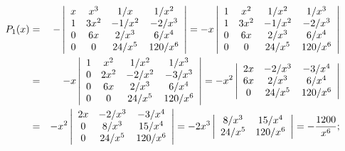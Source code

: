 \documentclass[dvips]{book}
\numberwithin{example}{section}
\numberwithin{equation}{section}
\numberwithin{theorem}{section}
\numberwithin{table}{section}
\numberwithin{figure}{section}
\begin{document}
\begin{eqnarray*}
P_1(x)&=&
-\left|\begin{array}{cccc}
x&x^3&1/x&1/x^2\\
1&3x^2&-1/x^2&-2/x^3\\
0&6x&2/x^3&6/x^4\\0&0&24/x^5&120/x^6
\end{array}\right|=
-x\left|\begin{array}{cccc}
1&x^2&1/x^2&1/x^3\\
1&3x^2&-1/x^2&-2/x^3\\
0&6x&2/x^3&6/x^4\\0&0&24/x^5&120/x^6
\end{array}\right|\\
&=&-x\left|\begin{array}{cccc}
1&x^2&1/x^2&1/x^3\\
0&2x^2&-2/x^2&-3/x^3\\
0&6x&2/x^3&6/x^4\\0&0&24/x^5&120/x^6
\end{array}\right|
=-x^2\left|\begin{array}{cccc}
2x&-2/x^3&-3/x^4\\
6x&2/x^3&6/x^4\\
0&24/x^5&120/x^6
\end{array}\right|\\
&=&-x^2\left|\begin{array}{cccc}
2x&-2/x^3&-3/x^4\\
0&8/x^3&15/x^4\\
0&24/x^5&120/x^6
\end{array}\right|=
-2x^3\left|\begin{array}{cccc}
8/x^3&15/x^4\\
24/x^5&120/x^6
\end{array}\right|=-{1200\over x^6};
\end{eqnarray*}
\end{document}
